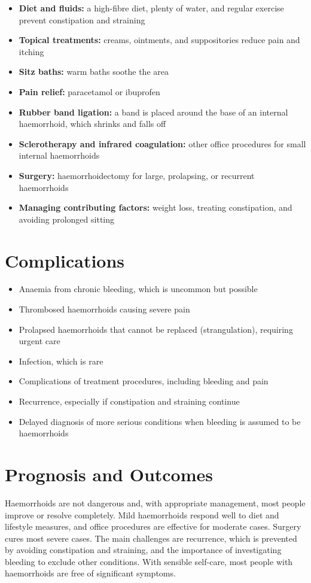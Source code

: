 \begin{itemize}
    \item \textbf{Diet and fluids:} a high-fibre diet, plenty of water, and regular exercise prevent constipation and straining
    \item \textbf{Topical treatments:} creams, ointments, and suppositories reduce pain and itching
    \item \textbf{Sitz baths:} warm baths soothe the area
    \item \textbf{Pain relief:} paracetamol or ibuprofen
    \item \textbf{Rubber band ligation:} a band is placed around the base of an internal haemorrhoid, which shrinks and falls off
    \item \textbf{Sclerotherapy and infrared coagulation:} other office procedures for small internal haemorrhoids
    \item \textbf{Surgery:} haemorrhoidectomy for large, prolapsing, or recurrent haemorrhoids
    \item \textbf{Managing contributing factors:} weight loss, treating constipation, and avoiding prolonged sitting
\end{itemize}

\section*{Complications}
\begin{itemize}
    \item Anaemia from chronic bleeding, which is uncommon but possible
    \item Thrombosed haemorrhoids causing severe pain
    \item Prolapsed haemorrhoids that cannot be replaced (strangulation), requiring urgent care
    \item Infection, which is rare
    \item Complications of treatment procedures, including bleeding and pain
    \item Recurrence, especially if constipation and straining continue
    \item Delayed diagnosis of more serious conditions when bleeding is assumed to be haemorrhoids
\end{itemize}

\section*{Prognosis and Outcomes}
Haemorrhoids are not dangerous and, with appropriate management, most people improve or resolve completely. Mild haemorrhoids respond well to diet and lifestyle measures, and office procedures are effective for moderate cases. Surgery cures most severe cases. The main challenges are recurrence, which is prevented by avoiding constipation and straining, and the importance of investigating bleeding to exclude other conditions. With sensible self-care, most people with haemorrhoids are free of significant symptoms.

